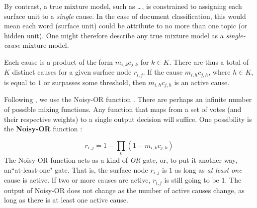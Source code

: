 By contrast, a true mixture model, such as \dots, is constrained to assigning each surface 
unit to a \emph{single} cause. In the case of 
document classification, this would mean each word (surface unit) could be attribute to no more than
one topic (or hidden unit). One might therefore describe any true
mixture model as a \emph{single-cause} mixture model. 

Each cause is a product of the form $m_{i,k} c_{j,k}$ for $k \in K$.
There are thus a total of $K$ distinct causes for a given surface node $r_{i,j}$. 
If the cause $m_{i,h} c_{j,h}$, where $h \in K$, is equal to $1$ or surpasses some
threshold, then $m_{i,h} c_{j,h}$ is an active cause.

Following \cite{saund:94}, we use the Noisy-OR function \citep{pearl:1988}.
There are perhaps an infinite number of possible mixing functions. 
Any function that maps from a set of votes 
(and their respective weights) to a single output decision will suffice.
One possibility is the \textbf{Noisy-OR} function \citep{pearl:1988}:
 
\begin{equation}\label{eq:noisy-or}
r_{i,j} = 1 - \prod\limits_{k} (1 - m_{i,k} c_{j,k})
\end{equation}
 The Noisy-OR function acts as a kind of \textit{OR} gate, or, to put it another way, 
 an``at-least-one" gate. That is, the surface node $r_{i,j}$ is $1$ as long as 
 \emph{at least one} cause is active.
 If two or more causes are active,
$r_{i,j}$ is still going to be $1$. The output of Noisy-OR does not change 
as the number of active causes change, as long as there is at least one active cause.

